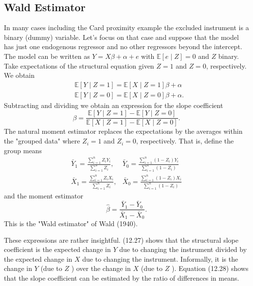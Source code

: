 \documentclass[10pt]{article}
\begin{document}
\subsection{Wald Estimator}
In many cases including the Card proximity example the excluded instrument is a binary (dummy) variable. Let's focus on that case and suppose that the model has just one endogenous regressor and no other regressors beyond the intercept. The model can be written as $Y=X \beta+\alpha+e$ with $\mathbb{E}[e \mid Z]=0$ and $Z$ binary. Take expectations of the structural equation given $Z=1$ and $Z=0$, respectively. We obtain
$$
\begin{aligned}
&\mathbb{E}[Y \mid Z=1]=\mathbb{E}[X \mid Z=1] \beta+\alpha \\
&\mathbb{E}[Y \mid Z=0]=\mathbb{E}[X \mid Z=0] \beta+\alpha .
\end{aligned}
$$
Subtracting and dividing we obtain an expression for the slope coefficient
$$
\beta=\frac{\mathbb{E}[Y \mid Z=1]-\mathbb{E}[Y \mid Z=0]}{\mathbb{E}[X \mid Z=1]-\mathbb{E}[X \mid Z=0]} .
$$
The natural moment estimator replaces the expectations by the averages within the "grouped data" where $Z_{i}=1$ and $Z_{i}=0$, respectively. That is, define the group means
$$
\begin{array}{ll}
\bar{Y}_{1}=\frac{\sum_{i=1}^{n} Z_{i} Y_{i}}{\sum_{i=1}^{n} Z_{i}}, & \bar{Y}_{0}=\frac{\sum_{i=1}^{n}\left(1-Z_{i}\right) Y_{i}}{\sum_{i=1}^{n}\left(1-Z_{i}\right)} \\
\bar{X}_{1}=\frac{\sum_{i=1}^{n} Z_{i} X_{i}}{\sum_{i=1}^{n} Z_{i}}, & \bar{X}_{0}=\frac{\sum_{i=1}^{n}\left(1-Z_{i}\right) X_{i}}{\sum_{i=1}^{n}\left(1-Z_{i}\right)}
\end{array}
$$
and the moment estimator
$$
\widehat{\beta}=\frac{\bar{Y}_{1}-\bar{Y}_{0}}{\bar{X}_{1}-\bar{X}_{0}} .
$$
This is the "Wald estimator" of Wald (1940).

These expressions are rather insightful. (12.27) shows that the structural slope coefficient is the expected change in $Y$ due to changing the instrument divided by the expected change in $X$ due to changing the instrument. Informally, it is the change in $Y$ (due to $Z$ ) over the change in $X$ (due to $Z$ ). Equation (12.28) shows that the slope coefficient can be estimated by the ratio of differences in means.
\end{document}
